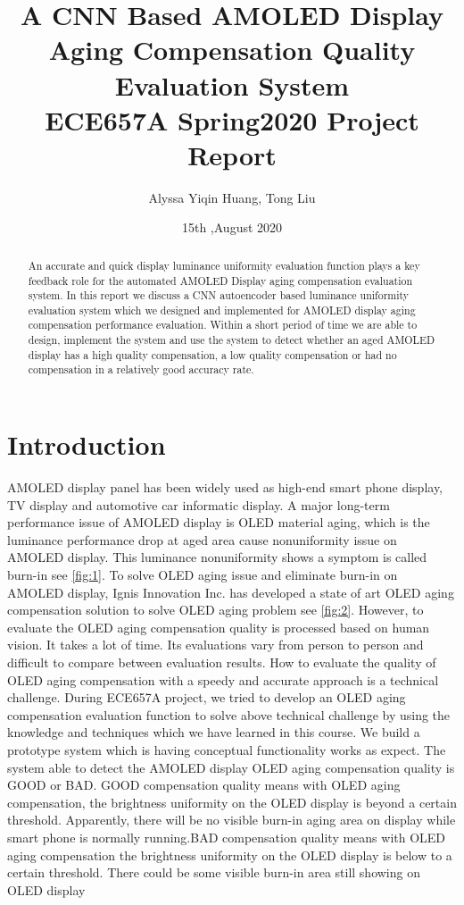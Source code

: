 \documentclass[runningheads]{llncs}
\title{A CNN Based AMOLED Display Aging Compensation Quality Evaluation System\\
ECE657A Spring2020 Project Report}
\author{Alyssa Yiqin Huang, Tong Liu}
\date{15th ,August 2020}
\institute{Electrical and Computer Engineering, University of Waterloo\\
200 University Ave W, Waterloo, ON N2L 3G1, Ontario, Canada\\
\email{ yiqin.huang@uwaterloo.ca ,t344liu@uwaterloo.ca}}
\begin{document}
\maketitle              %
%
\begin{abstract}
An accurate and quick display luminance uniformity evaluation function plays a key feedback role for the automated AMOLED Display aging compensation evaluation system. In this report we discuss a CNN autoencoder based luminance uniformity evaluation system which we designed and implemented for AMOLED display aging compensation performance evaluation. Within a short period of time we are able to design, implement the system and use the system to detect whether an aged AMOLED display has a high quality compensation, a low quality compensation or had no compensation in a relatively good accuracy rate.

\end{abstract}

%
%
%
\section{Introduction}
AMOLED display panel has been widely used as high-end smart phone display, TV display and
automotive car informatic display. A major long-term performance issue of AMOLED display is OLED
material aging, which is the luminance performance drop at aged area cause nonuniformity issue on AMOLED display. This luminance nonuniformity shows a symptom is called burn-in see \ref{fig:1}.
To solve OLED aging issue and eliminate burn-in on AMOLED display, Ignis Innovation Inc. has developed a state of art OLED aging compensation solution to solve OLED aging problem see \ref{fig:2}.
However, to evaluate the OLED aging compensation quality is processed based on human vision. It
takes a lot of time. Its evaluations vary from person to person and difficult to compare between
evaluation results. How to evaluate the quality of OLED aging compensation with a speedy and
accurate approach is a technical challenge.
During ECE657A project, we tried to develop an OLED aging compensation evaluation function to solve above technical challenge by using the knowledge and techniques which we have learned in this course. We build a prototype system which is having conceptual functionality works as expect. The system able to detect the AMOLED display OLED aging compensation quality is GOOD or BAD. GOOD compensation quality means with OLED aging compensation, the brightness uniformity on the OLED display is beyond a certain threshold. Apparently, there will be no visible burn-in aging area on display while smart phone is normally running.BAD compensation quality means with OLED aging compensation the brightness uniformity on the OLED display is below to a certain threshold. There could be some visible burn-in area still showing on OLED display
\end{document}
